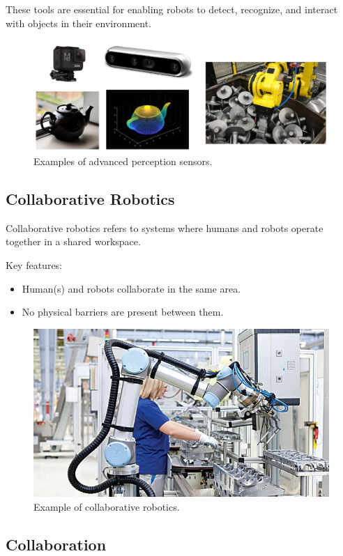 These tools are essential for enabling robots to detect, recognize, and interact with objects in their environment.

\begin{figure}[H]
    \centering
    \includegraphics[width=\linewidth]{imgs/advanced_perception_sensors.png}
    \caption{Examples of advanced perception sensors.}
\end{figure}

\hfill

\subsection{Collaborative Robotics}

Collaborative robotics refers to systems where humans and robots operate together in a shared workspace.

Key features:
\begin{itemize}
  \item Human(s) and robots collaborate in the same area.
  \item No physical barriers are present between them.
\end{itemize}

\hfill
\begin{figure}[H]
    \centering
    \includegraphics[width=0.6\linewidth]{imgs/collaborative_robotics_example.png}
    \caption{Example of collaborative robotics.}
\end{figure}

\hfill

\subsection{Collaboration}

